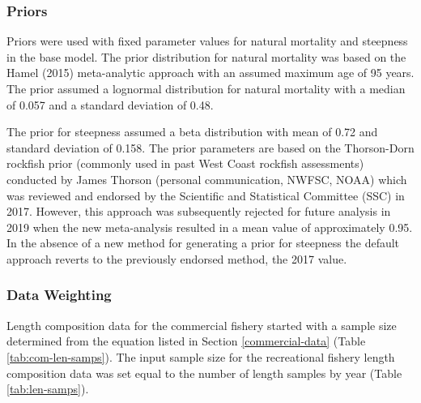 \documentclass[11pt,
  english,
  a4paper,
]{article}
\begin{document}
\hypertarget{priors}{%
\subsubsection{Priors}\label{priors}}

\leavevmode\tagmcend\tagstructend


Priors were used with fixed parameter values for natural mortality and steepness in the base model. The prior distribution for natural mortality was based on the Hamel {(2015)\leavevmode\tagmcend\tagstructend} meta-analytic approach with an assumed maximum age of 95 years. The prior assumed a lognormal distribution for natural mortality with a median of 0.057 and a standard deviation of 0.48.

\leavevmode\tagmcend\tagstructend\par


The prior for steepness assumed a beta distribution with mean of 0.72 and standard deviation of 0.158. The prior parameters are based on the Thorson-Dorn rockfish prior (commonly used in past West Coast rockfish assessments) conducted by James Thorson (personal communication, NWFSC, NOAA) which was reviewed and endorsed by the Scientific and Statistical Committee (SSC) in 2017. However, this approach was subsequently rejected for future analysis in 2019 when the new meta-analysis resulted in a mean value of approximately 0.95. In the absence of a new method for generating a prior for steepness the default approach reverts to the previously endorsed method, the 2017 value.

\leavevmode\tagmcend\tagstructend\par


\hypertarget{data-weighting}{%
\subsubsection{Data Weighting}\label{data-weighting}}

\leavevmode\tagmcend\tagstructend


Length composition data for the commercial fishery started with a sample size determined from the equation listed in Section \ref{commercial-data} (Table \ref{tab:com-len-samps}). The input sample size for the recreational fishery length composition data was set equal to the number of length samples by year (Table \ref{tab:len-samps}).
\end{document}
